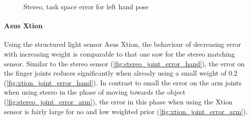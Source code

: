 \begin{figure}
\centering
{}
%
\caption{Stereo, task space error for left hand pose}
\label{fig:stereo_hand_pose_error}
\end{figure}



\paragraph{Asus Xtion}

Using the structured light sensor Asus Xtion, the behaviour of decreasing error with increasing weight is comparable to that one saw for the stereo matching sensor. Similar to the stereo sensor (\cref{fig:stereo_joint_error_hand}), the error on the finger joints reduces significantly when already using a small weight of $0.2$ (\cref{fig:xtion_joint_error_hand}).
In contrast to small the error on the arm joints when using stereo in the phase of moving towards the object (\cref{fig:stereo_joint_error_arm}), the error in this phase when using the Xtion sensor is fairly large for no and low weighted prior (\cref{fig:xtion_joint_error_arm}).

